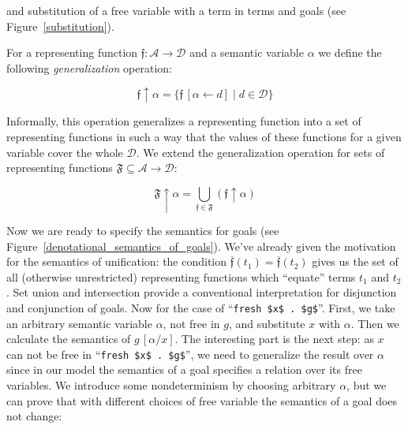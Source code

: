 and substitution of a free variable with a term in terms and goals (see Figure~\ref{substitution}).

For a representing function $\mathfrak{f}:\mathcal{A}\to\mathcal{D}$ and a semantic variable $\alpha$ we define
the following \emph{generalization} operation:

\[
\mathfrak{f}\uparrow\alpha = \{ \mathfrak{f}\,[\alpha\gets d] \mid d\in\mathcal D\}
\]

Informally, this operation generalizes a representing function into a set of representing functions in such a way that the
values of these functions for a given variable cover the whole $\mathcal{D}$. We extend the generalization operation for sets of
representing functions $\mathfrak{F}\subseteq\mathcal{A}\to\mathcal{D}$:

\[
  \mathfrak{F}\uparrow\alpha = \bigcup_{\mathfrak{f}\in\mathfrak{F}}(\mathfrak{f}\uparrow\alpha)
\]

Now we are ready to specify the semantics for goals (see Figure~\ref{denotational_semantics_of_goals}).
 We've already given the motivation for
  the semantics of unification: the condition $\overline{\mathfrak{f}}(t_1)=\overline{\mathfrak{f}}(t_2)$ gives us the set of all (otherwise
  unrestricted) representing functions which ``equate'' terms $t_1$ and $t_2$.
  Set union and intersection provide a conventional interpretation
for disjunction and conjunction of goals. Now for the case of ``\lstinline|fresh $x$ . $g$|''. First, we take an arbitrary semantic variable $\alpha$,
not free in $g$, and substitute $x$ with $\alpha$. Then we calculate the semantics of $g\,[\alpha/x]$. The interesting part is the next step:
as $x$ can not be free in ``\lstinline|fresh $x$ . $g$|'', we need to generalize the result over $\alpha$ since in our model the semantics of a
goal specifies a relation over its free variables. We introduce some nondeterminism by choosing arbitrary $\alpha$, but we can prove that with different
choices of free variable the semantics of a goal does not change:

